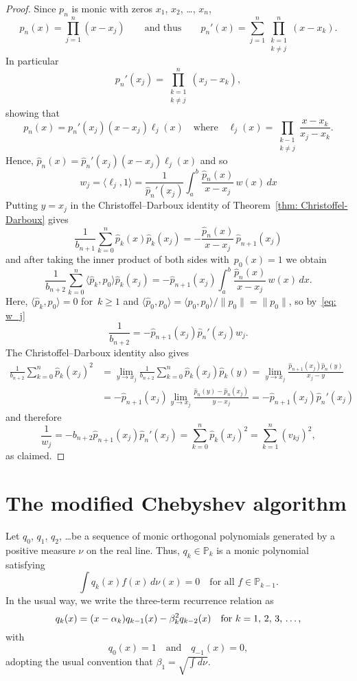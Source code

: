 \documentclass[12pt,a4paper]{article}
\newcommand{\iprod}[1]{\langle#1\rangle}
\newcommand{\Poly}{\mathbb{P}}
\begin{document}
\begin{proof}
Since $p_n$ is monic with zeros $x_1$, $x_2$, \dots, $x_n$,
\[
p_n(x)=\prod_{j=1}^n(x-x_j)
\qquad\text{and thus}\qquad
p_n'(x)=\sum_{j=1}^n\prod_{\substack{k=1\\ k\ne j}}^n(x-x_k).
\]
In particular
\[
p_n'(x_j)=\prod_{\substack{k=1\\ k\ne j}}^n(x_j-x_k),
\]
showing that
\[
p_n(x)=p_n'(x_j)(x-x_j)\ell_j(x)\quad\text{where}\quad
\ell_j(x)=\prod_{\substack{k-1\\ k\ne j}}\frac{x-x_k}{x_j-x_k}.
\]
Hence, $\hat p_n(x)=\hat p_n'(x_j)(x-x_j)\ell_j(x)$ and so
\begin{equation}\label{eq: w_j}
w_j=\iprod{\ell_j,1}=\frac{1}{\hat p_n'(x_j)}
	\int_a^b\frac{\hat p_n(x)}{x-x_j}\,w(x)\,dx
\end{equation}
Putting $y=x_j$ in the Christoffel--Darboux identity of 
Theorem~\ref{thm: Christoffel-Darboux} gives
\[
\frac{1}{b_{n+1}}\sum_{k=0}^n\hat p_k(x)\hat p_k(x_j)
	=-\frac{\hat p_n(x)}{x-x_j}\,\hat p_{n+1}(x_j)
\]
and after taking the inner product of both sides with~$p_0(x)=1$
we obtain
\[
\frac{1}{b_{n+2}}\sum_{k=0}^n\iprod{\hat p_k,p_0}\hat p_k(x_j)
	=-\hat p_{n+1}(x_j)\int_a^b\frac{\hat p_n(x)}{x-x_j}\,w(x)\,dx.
\]
Here, $\iprod{\hat p_k,p_0}=0$ for~$k\ge1$ and 
$\iprod{\hat p_0,p_0}=\iprod{p_0,p_0}/\|p_0\|=\|p_0\|$, so 
by~\eqref{eq: w_j}
\[
\frac{1}{b_{n+2}}=-\hat p_{n+1}(x_j)\hat p_n'(x_j)w_j.
\]
The Christoffel--Darboux identity also gives
\begin{align*}
\frac{1}{b_{n+2}}\sum_{k=0}^n\hat p_k(x_j)^2
&=\lim_{y\to x_j}\frac{1}{b_{n+2}}\sum_{k=0}^n
	\hat p_k(x_j)\hat p_k(y)
=\lim_{y\to x_j}\frac{\hat p_{n+1}(x_j)\hat p_n(y)}{x_j-y}\\
&=-\hat p_{n+1}(x_j)\lim_{y\to x_j}
	\frac{\hat p_n(y)-\hat p_n(x_j)}{y-x_j}
	=-\hat p_{n+1}(x_j)\hat p_n'(x_j) 
\end{align*}
and therefore
\[
\frac{1}{w_j}=-b_{n+2}\hat p_{n+1}(x_j)\hat p_n'(x_j)
	=\sum_{k=0}^n\hat p_k(x_j)^2=\sum_{k=1}^n(v_{kj})^2,
\]
as claimed.
\end{proof}


\section{The modified Chebyshev algorithm}

Let $q_0$, $q_1$, $q_2$, \dots be a sequence of monic orthogonal 
polynomials generated by a positive measure $\nu$ on the real line.  
Thus, $q_k\in\Poly_k$ is a monic polynomial satisfying 
\[
\int q_k(x)f(x)\,d\nu(x)=0\quad\text{for all $f\in\Poly_{k-1}$.}
\]
In the usual way, we write the three-term recurrence relation as
\begin{equation}\label{eq: 3 term q}
q_k(x)=(x-\alpha_k)q_{k-1}(x)-\beta_k^2 q_{k-2}(x)
	\quad\text{for $k=1$, $2$, $3$, \dots,}
\end{equation}
with
\[
q_0(x)=1\quad\text{and}\quad q_{-1}(x)=0,
\]
adopting the usual convention that $\beta_1=\sqrt{\int d\nu}$.
\end{document}
